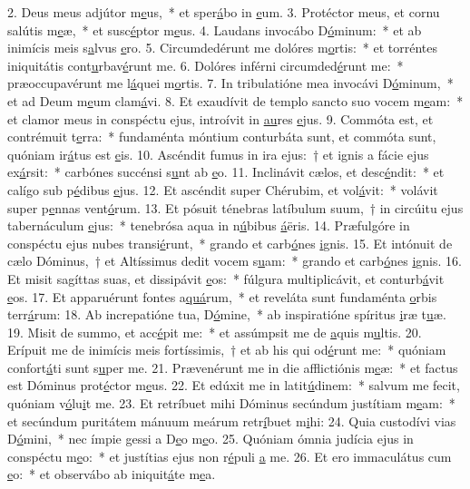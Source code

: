 2. Deus meus adjútor m\uline{e}us,~* et sper\uline{á}bo in \uline{e}um.
3. Protéctor meus, et cornu salútis m\uline{e}æ,~* et susc\uline{é}ptor m\uline{e}us.
4. Laudans invocábo D\uline{ó}minum:~* et ab inimícis meis s\uline{a}lvus \uline{e}ro.
5. Circumdedérunt me dolóres m\uline{o}rtis:~* et torréntes iniquitátis cont\uline{u}rbav\uline{é}runt me.
6. Dolóres inférni circumded\uline{é}runt me:~* præoccupavérunt me l\uline{á}quei m\uline{o}rtis.
7. In tribulatióne mea invocávi D\uline{ó}minum,~* et ad Deum m\uline{e}um clam\uline{á}vi.
8. Et exaudívit de templo sancto suo vocem m\uline{e}am:~* et clamor meus in conspéctu ejus, introívit in \uline{au}res \uline{e}jus.
9. Commóta est, et contrémuit t\uline{e}rra:~* fundaménta móntium conturbáta sunt, et commóta sunt, quóniam ir\uline{á}tus est \uline{e}is.
10. Ascéndit fumus in ira ejus:~† et ignis a fácie ejus ex\uline{á}rsit:~* carbónes succénsi s\uline{u}nt ab \uline{e}o.
11. Inclinávit cælos, et desc\uline{é}ndit:~* et calígo sub p\uline{é}dibus \uline{e}jus.
12. Et ascéndit super Chérubim, et vol\uline{á}vit:~* volávit super p\uline{e}nnas vent\uline{ó}rum.
13. Et pósuit ténebras latíbulum suum,~† in circúitu ejus tabernáculum \uline{e}jus:~* tenebrósa aqua in n\uline{ú}bibus \uline{á}ëris.
14. Præfulgóre in conspéctu ejus nubes transi\uline{é}runt,~* grando et carb\uline{ó}nes \uline{i}gnis.
15. Et intónuit de cælo Dóminus,~† et Altíssimus dedit vocem s\uline{u}am:~* grando et carb\uline{ó}nes \uline{i}gnis.
16. Et misit sagíttas suas, et dissipávit \uline{e}os:~* fúlgura multiplicávit, et conturb\uline{á}vit \uline{e}os.
17. Et apparuérunt fontes a\uline{quá}rum,~* et reveláta sunt fundaménta \uline{o}rbis terr\uline{á}rum:
18. Ab increpatióne tua, D\uline{ó}mine,~* ab inspiratióne spíritus \uline{i}ræ t\uline{u}æ.
19. Misit de summo, et acc\uline{é}pit me:~* et assúmpsit me de \uline{a}quis m\uline{u}ltis.
20. Erípuit me de inimícis meis fortíssimis,~† et ab his qui od\uline{é}runt me:~* quóniam confort\uline{á}ti sunt s\uline{u}per me.
21. Prævenérunt me in die afflictiónis m\uline{e}æ:~* et factus est Dóminus prot\uline{é}ctor m\uline{e}us.
22. Et edúxit me in latit\uline{ú}dinem:~* salvum me fecit, quóniam v\uline{ó}lu\uline{i}t me.
23. Et retríbuet mihi Dóminus secúndum justítiam m\uline{e}am:~* et secúndum puritátem mánuum meárum retr\uline{í}buet m\uline{i}hi:
24. Quia custodívi vias D\uline{ó}mini,~* nec ímpie gessi a D\uline{e}o m\uline{e}o.
25. Quóniam ómnia judícia ejus in conspéctu m\uline{e}o:~* et justítias ejus non r\uline{é}puli \uline{a} me.
26. Et ero immaculátus cum \uline{e}o:~* et observábo ab iniquit\uline{á}te m\uline{e}a.

